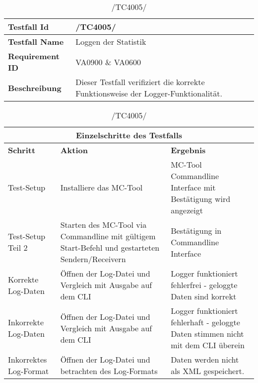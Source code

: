 \begin{table}[h]
\caption{/TC4005/}
\label{tab:TC4005}
\begin{center}
\begin{tabular}{|p{3.5cm}|p{9cm}|}
\hline
\textbf{Testfall Id} & /TC4005/\\
\hline
\textbf{Testfall Name} & Loggen der Statistik\\
\hline
\textbf{Requirement ID} & VA0900 \& VA0600\\
\hline
\textbf{Beschreibung} & Dieser Testfall verifiziert die korrekte
Funktionsweise der Logger-Funktionalität.\\
\hline
\end{tabular}
\begin{tabular}{|p{2.5cm}|p{5cm}|p{4.55cm}|}
\multicolumn{3}{|c|}{\textbf{Einzelschritte des Testfalls}} \\
\hline
\textbf{Schritt} & \textbf{Aktion} & \textbf{Ergebnis}\\
\hline
Test-Setup & Installiere das MC-Tool & MC-Tool Commandline Interface mit Bestätigung wird angezeigt\\
\hline
Test-Setup Teil 2 & Starten des MC-Tool via Commandline mit gültigem
Start-Befehl und gestarteten Sendern/Receivern & Bestätigung in Commandline
Interface\\
\hline
Korrekte Log-Daten & Öffnen der Log-Datei und Vergleich mit Ausgabe auf dem
CLI & Logger funktioniert fehlerfrei - geloggte Daten sind korrekt
\\
\hline
Inkorrekte Log-Daten & Öffnen der Log-Datei und Vergleich mit Ausgabe auf dem
CLI & Logger funktioniert fehlerhaft - geloggte Daten stimmen nicht mit dem CLI
überein
\\
\hline
Inkorrektes Log-Format & Öffnen der Log-Datei und betrachten des Log-Formats &
Daten werden nicht als XML gespeichert.
\\
\hline
\end{tabular}
\end{center}
\label{default}
\end{table}

